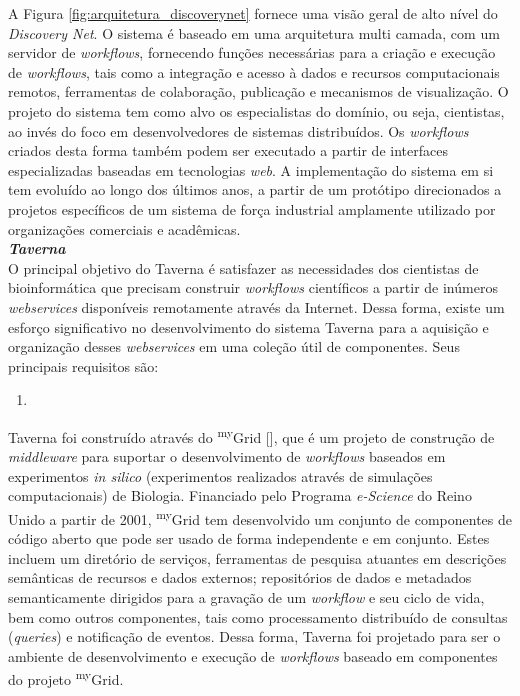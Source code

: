 A Figura \ref{fig:arquitetura_discoverynet} fornece uma visão geral de alto nível do \textit{Discovery Net}. O sistema é baseado em uma arquitetura multi camada, com um servidor de \textit{workflows}, fornecendo funções necessárias para a criação e execução de \textit{workflows}, tais como a integração e acesso à dados e recursos computacionais remotos, ferramentas de colaboração, publicação e mecanismos de visualização. O projeto do sistema tem como alvo os especialistas do domínio, ou seja, cientistas, ao invés do foco em desenvolvedores de sistemas distribuídos. Os \textit{workflows} criados desta forma também podem ser executado a partir de interfaces especializadas baseadas em tecnologias \textit{web}. A implementação do sistema em si tem evoluído ao longo dos últimos anos, a partir de um protótipo direcionados a projetos específicos de um sistema de força industrial amplamente utilizado por organizações comerciais e acadêmicas. \\

\noindent
\textbf{\textit{Taverna}} \\

\noindent
O principal objetivo do Taverna é satisfazer as necessidades dos cientistas de bioinformática que precisam construir \textit{workflows} científicos a partir de inúmeros \textit{webservices} disponíveis remotamente através da Internet. Dessa forma, existe um esforço significativo no desenvolvimento do sistema Taverna para a aquisição e organização desses \textit{webservices} em uma coleção útil de componentes. Seus principais requisitos são:
    
    \begin{enumerate}
		\item 
	\end{enumerate}

Taverna foi construído através do \textsuperscript{my}Grid [], que é um projeto de construção de \textit{middleware} para suportar o desenvolvimento de \textit{workflows} baseados em experimentos \textit{in silico} (experimentos realizados através de simulações computacionais) de Biologia. Financiado pelo Programa \textit{e-Science} do Reino Unido a partir de 2001, \textsuperscript{my}Grid tem desenvolvido um conjunto de componentes de código aberto que pode ser usado de forma independente e em conjunto. Estes incluem um diretório de serviços, ferramentas de pesquisa atuantes em descrições semânticas de recursos e dados externos; repositórios de dados e metadados semanticamente dirigidos para a gravação de um \textit{workflow} e seu ciclo de vida, bem como outros componentes, tais como processamento distribuído de consultas (\textit{queries}) e notificação de eventos. Dessa forma, Taverna foi projetado para ser o ambiente de desenvolvimento e execução de \textit{workflows} baseado em componentes do projeto \textsuperscript{my}Grid.

